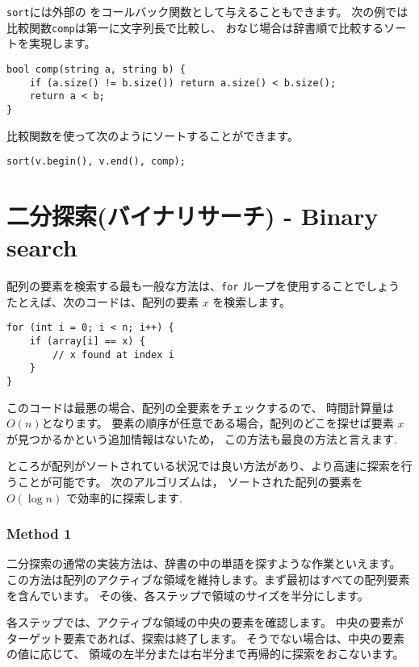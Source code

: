 \texttt{sort}には外部の
をコールバック関数として与えることもできます。
次の例では比較関数\texttt{comp}は第一に文字列長で比較し、
おなじ場合は辞書順で比較するソートを実現します。

\begin{lstlisting}
bool comp(string a, string b) {
    if (a.size() != b.size()) return a.size() < b.size();
    return a < b;
}
\end{lstlisting}
比較関数を使って次のようにソートすることができます。
\begin{lstlisting}
sort(v.begin(), v.end(), comp);
\end{lstlisting}

\section{二分探索(バイナリサーチ) - Binary search}


配列の要素を検索する最も一般な方法は、\texttt{for} ループを使用することでしょう
たとえば、次のコードは、配列の要素 $x$ を検索します。

\begin{lstlisting}
for (int i = 0; i < n; i++) {
    if (array[i] == x) {
        // x found at index i
    }
}
\end{lstlisting}

このコードは最悪の場合、配列の全要素をチェックするので、
時間計算量は$O(n)$となります。
要素の順序が任意である場合，配列のどこを探せば要素 $x$ が見つかるかという追加情報はないため，
この方法も最良の方法と言えます.

ところが配列がソートされている状況では良い方法があり、より高速に探索を行うことが可能です。
次のアルゴリズムは，
ソートされた配列の要素を $O(\log n)$ で効率的に探索します.

\subsubsection{Method 1}

二分探索の通常の実装方法は、辞書の中の単語を探すような作業といえます。
この方法は配列のアクティブな領域を維持します。まず最初はすべての配列要素を含んでいます。
その後、各ステップで領域のサイズを半分にします。

各ステップでは、アクティブな領域の中央の要素を確認します。
中央の要素がターゲット要素であれば、探索は終了します。
そうでない場合は、中央の要素の値に応じて、
領域の左半分または右半分まで再帰的に探索をおこないます。

